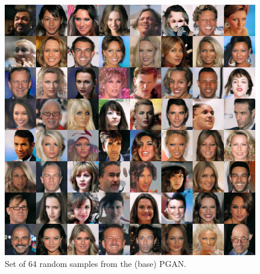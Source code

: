 \documentclass{article}
\newcommand{\exfactor}{1.0}
\begin{document}
\begin{figure}[htbp]
    \centering
    \includegraphics[width=\exfactor\textwidth]{figures/pgan/all_base_iso_base_lq.jpg}
    \caption{
    Set of 64 random samples from the (base) PGAN\@.
    }
\end{figure}
\end{document}
